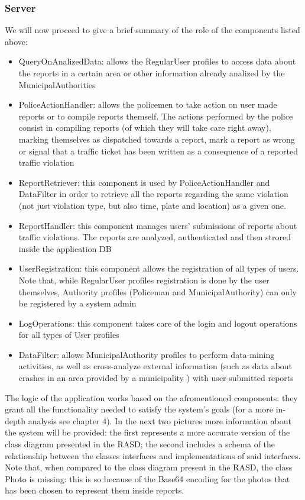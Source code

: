 \subsubsection{Server}
We will now proceed to give a brief summary of the role of the components listed above:
\begin{itemize}
\item QueryOnAnalizedData: allows the RegularUser profiles to access data about the reports in a certain area or other information already analized by the MunicipalAuthorities
\item PoliceActionHandler: allows the policemen to take action on user made reports or to compile reports themself. The actions performed by the police consist in compiling reports (of which they will take care right away), marking themselves as dispatched towards a report, mark a report as wrong or signal that a traffic ticket has been written as a consequence of a reported traffic violation
\item ReportRetriever: this component is used by PoliceActionHandler and DataFilter in order to retrieve all the reports regarding the same violation (not just violation type, but also time, plate and location) as a given one. 
\item ReportHandler: this component manages users' submissions of reports about traffic violations. The reports are analyzed, authenticated and then strored inside the application DB
\item UserRegistration: this component allows the registration of all types of users. Note that, while RegularUser profiles registration is done by the user themselves, Authority profiles (Policeman and MunicipalAuthority) can only be registered by a system admin
\item LogOperations: this component takes care of the login and logout operations for all types of User profiles
\item DataFilter: allows MunicipalAuthority profiles to perform data-mining activities,  as well as cross-analyze external information (such as data about crashes in an area provided by a municipality ) with user-submitted reports
\end{itemize}
The logic of the application works based on the afromentioned components: they grant all the functionality needed to satisfy the system's goals (for a more in-depth analysis see chapter 4).
In the next two pictures more information about the system will be provided: the first represents a more accurate version of the class diagram presented in the RASD; the second includes a schema of the relationship between the classes interfaces and implementations of said interfaces. \newline
Note that, when compared to the class diagram present in the RASD, the class Photo is missing: this is so because of the Base64 encoding for the photos that has been chosen to represent them inside reports.

